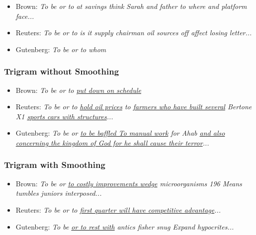 \begin{itemize}
\item Brown: \textit{To be or to at savings think Sarah and father to where and platform face...}
\item Reuters: \textit{To be or to is it supply chairman oil sources off affect losing letter...}
\item Gutenberg: \textit{To be or to whom}
\end{itemize}

\subsubsection{\textbf{Trigram without Smoothing}}

\begin{itemize}
\item Brown: \textit{To be or to \uline{put down on schedule}}
\item Reuters: \textit{To be or to \uline{hold oil prices} to \uline{farmers who have built several} Bertone X1 \uline{sports cars with structures}...}
\item Gutenberg: \textit{To be or \uline{to be baffled To manual work} for Ahab \uline{and also concerning the kingdom of God for he shall cause their terror}...}
\end{itemize}

\subsubsection{\textbf{Trigram with Smoothing}}

\begin{itemize}
\item Brown: \textit{To be or \uline{to costly improvements wedge} microorganisms 196 Means tumbles juniors interposed...}
\item Reuters: \textit{To be or to \uline{first quarter will have competitive advantage}...}
\item Gutenberg: \textit{To be \uline{or to rest with} antics fisher snug Expand hypocrites...}
\end{itemize}